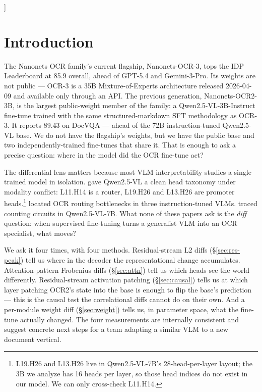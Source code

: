 \documentclass[10pt,twocolumn,letterpaper]{article}
\begin{document}
\begin{@twocolumnfalse}
\begin{abstract}
instruction tokens, 27\% post-image, 20\% image tokens). OCR2's vision encoder is perturbed $1.60\times$ more than its decoder in fractional Frobenius terms (11.2\% vs.\ 7.0\% mean), but the parallel measurement on OCR-s gives 1.1\% --- an order of magnitude lower. The ViT edit is specific to how Nanonets trained OCR2, not a property of OCR fine-tuning the shared base.
\end{abstract}
\vspace{1em}
\end{@twocolumnfalse}
]
\makeatother

\section{Introduction}
\label{sec:intro}

The Nanonets OCR family's current flagship, Nanonets-OCR-3, tops the IDP Leaderboard at 85.9 overall, ahead of GPT-5.4 and Gemini-3-Pro. Its weights are not public --- OCR-3 is a 35B Mixture-of-Experts architecture released 2026-04-09 and available only through an API. The previous generation, Nanonets-OCR2-3B, is the largest public-weight member of the family: a Qwen2.5-VL-3B-Instruct \citep{qwenteam2025qwen25vl} fine-tune trained with the same structured-markdown SFT methodology as OCR-3. It reports 89.43 on DocVQA --- ahead of the 72B instruction-tuned Qwen2.5-VL base. We do not have the flagship's weights, but we have the public base and two independently-trained fine-tunes that share it. That is enough to ask a precise question: where in the model did the OCR fine-tune act?

The differential lens matters because most VLM interpretability studies a single trained model in isolation. \citet{hua2025conflicting} gave Qwen2.5-VL a clean head taxonomy under modality conflict: L11.H14 is a router, L19.H26 and L13.H26 are promoter heads.\footnote{L19.H26 and L13.H26 live in Qwen2.5-VL-7B's 28-head-per-layer layout; the 3B we analyze has 16 heads per layer, so those head indices do not exist in our model. We can only cross-check L11.H14.} \citet{steinberg2026ocrrouting} located OCR routing bottlenecks in three instruction-tuned VLMs. \citet{che2026counting} traced counting circuits in Qwen2.5-VL-7B. What none of these papers ask is the \emph{diff} question: when supervised fine-tuning turns a generalist VLM into an OCR specialist, what moves?

We ask it four times, with four methods. Residual-stream L2 diffs (\S\ref{sec:res-peak}) tell us where in the decoder the representational change accumulates. Attention-pattern Frobenius diffs (\S\ref{sec:attn}) tell us which heads see the world differently. Residual-stream activation patching (\S\ref{sec:causal}) tells us at which layer patching OCR2's state into the base is enough to flip the base's prediction --- this is the causal test the correlational diffs cannot do on their own. And a per-module weight diff (\S\ref{sec:weight}) tells us, in parameter space, what the fine-tune actually changed. The four measurements are internally consistent and suggest concrete next steps for a team adapting a similar VLM to a new document vertical.
\end{document}
